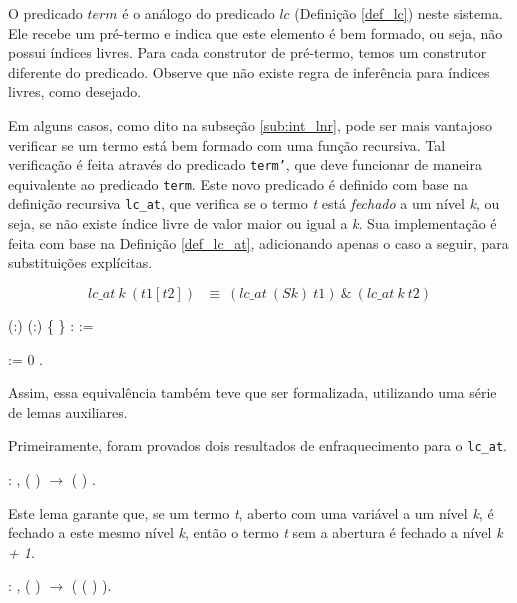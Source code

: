 O predicado $term$ é o análogo do predicado $lc$ (Definição \ref{def_lc})
neste sistema. Ele recebe um pré-termo e indica que este elemento é bem
formado, ou seja, não possui índices livres. Para cada construtor de pré-termo,
temos um construtor diferente do predicado. Observe que não existe regra de
inferência para índices livres, como desejado.

Em alguns casos, como dito na subseção \ref{sub:int_lnr}, pode ser mais
vantajoso verificar se um termo está bem formado com uma função recursiva.
Tal verificação é feita através do predicado \texttt{term'}, que deve funcionar de
maneira equivalente ao predicado \texttt{term}. Este novo predicado é definido
com base na definição recursiva \texttt{lc\_at}, que verifica se o termo
\emph{t} está \textit{fechado} a um nível \emph{k}, ou seja, se não existe
índice livre de valor maior ou igual a \emph{k}. Sua implementação é feita com
base na Definição \ref{def_lc_at}, adicionando apenas o caso a seguir, para
substituições explícitas.

\[  lc\_at\ k\ (t1[t2])\ \ \ \equiv\ (lc\_at\ (S k)\ t1)\ \&\ (lc\_at\ k\ t2) \]

\bigskip
{}  (:)
(:) \{ \} :
 :=\coqdoceol

   :=  0 .\coqdoceol
\bigskip

Assim, essa equivalência também teve que ser formalizada, utilizando uma série
de lemas auxiliares. 

Primeiramente, foram provados dois resultados de enfraquecimento para o
\texttt{lc\_at}.

\bigskip
\coqnoindent {}  :
\coqdockw{\ensuremath{\forall}}  
,  
(   )
\ensuremath{\rightarrow}  ( )
.\coqdoceol

\bigskip

Este lema garante que, se um termo \emph{t}, aberto com uma variável a um
nível \emph{k}, é fechado a este mesmo nível \emph{k}, então o termo \emph{t}
sem a abertura é fechado a nível \emph{k + 1}.

\bigskip

\coqnoindent {}  :
\coqdockw{\ensuremath{\forall}}  
,  (
)  \ensuremath{\rightarrow} 
 (  (
) ).\coqdoceol
\bigskip

